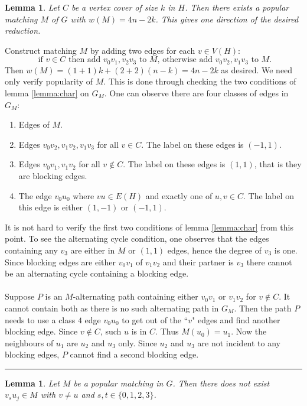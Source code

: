 \documentclass[letterpaper,12pt,oneside,onecolumn]{article}
\newenvironment{proof}{{\bf Proof:  }}{\hfill\rule{2mm}{2mm}}
\newtheorem{lemma}[fact]{Lemma}
\begin{document}
\begin{lemma}\label{lemma:firstreduc}
Let $C$ be a vertex cover of size $k$ in $H$. Then there exists a popular matching $M$ of $G$ with $w(M) = 4n-2k$. This gives one direction of the desired reduction.
\end{lemma}
\begin{proof}
Construct matching $M$ by adding two edges for each $v \in V(H)$:
$$\text{ if $v \in C$ then add $v_0v_1, v_2v_3$ to $M$, otherwise add $v_0v_2, v_1v_3$ to $M$}.$$
Then $w(M) = (1+1)k + (2+2)(n-k) = 4n - 2k$ as desired. We need only verify popularity of $M$. This is done through checking the two conditions of lemma \ref{lemma:char} on $G_M$. One can observe there are four classes of edges in $G_M$:
\begin{enumerate}
\item Edges of $M$.
\item Edges $v_0v_2, v_1v_2, v_1v_3$ for all $v \in C$. The label on these edges is $(-1,1)$.
\item Edges $v_0v_1, v_1v_2$ for all $v \not\in C$. The label on these edges is $(1,1)$, that is they are blocking edges.
\item The edge $v_0u_0$ where $vu \in E(H)$ and exactly one of $u,v \in C$. The label on this edge is either $(1,-1)$ or $(-1,1)$.
\end{enumerate}
It is not hard to verify the first two conditions of lemma \ref{lemma:char} from this point. To see the alternating cycle condition, one observes that the edges containing any $v_3$ are either in $M$ or $(1,1)$ edges, hence the degree of $v_3$ is one. Since blocking edges are either $v_0v_1$ of $v_1v_2$ and their partner is $v_3$ there cannot be an alternating cycle containing a blocking edge.
\paragraph{}
Suppose $P$ is an $M$-alternating path containing either $v_0v_1$ or $v_1v_2$ for $v \not\in C$. It cannot contain both as there is no such alternating path in $G_M$. Then the path $P$ needs to use a class $4$ edge $v_0u_0$ to get out of the ``$v$" edges and find another blocking edge. Since $v \not\in C$, such $u$ is in $C$. Thus $M(u_0) = u_1$. Now the neighbours of $u_1$ are $u_2$ and $u_3$ only. Since $u_2$ and $u_3$ are not incident to any blocking edges, $P$ cannot find a second blocking edge.
\end{proof}
\begin{lemma}\label{lemma:6.2}
Let $M$ be a popular matching in $G$. Then there does not exist $v_su_j \in M$ with $v\neq u$ and $s,t \in \{0,1,2,3\}$.
\end{lemma}
\end{document}
